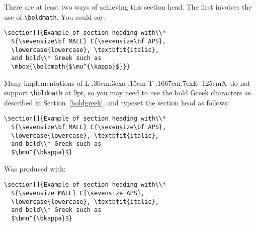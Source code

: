 \documentclass[useAMS,usenatbib]{mn2e}
\def\LaTeX{L\kern-.36em\raise.3ex\hbox{a}\kern-.15em
    T\kern-.1667em\lower.7ex\hbox{E}\kern-.125emX}
\begin{document}
%
There are at least two ways of achieving this section head. The first
involves the use of \verb"\boldmath". You could say:
%
\begin{verbatim}
\section[]{Example of section heading with\\*
  S{\sevensize\bf MALL} C{\sevensize\bf APS},
  \lowercase{lowercase}, \textbfit{italic},
  and bold\\* Greek such as
  \mbox{\boldmath{$\mu^{\kappa}$}}}
\end{verbatim}
%
Many implementations of \LaTeX\ do not support \verb"\boldmath" at 9pt,
so you may need to use the bold Greek characters as described in
Section~\ref{boldgreek}, and typeset the section head as follows:
%
\begin{verbatim}
\section[]{Example of section heading with\\*
  S{\sevensize\bf MALL} C{\sevensize\bf APS},
  \lowercase{lowercase}, \textbfit{italic},
  and bold\\* Greek such as
  $\bmu^{\bkappa}$}
\end{verbatim}
%
%
Was produced with:
%
\begin{verbatim}
\section[]{Example of section heading with\\*
  S{\sevensize MALL} C{\sevensize APS},
  \lowercase{lowercase}, \textbfit{italic},
  and bold\\* Greek such as
  $\bmu^{\bkappa}$}
\end{verbatim}
%
\end{document}
